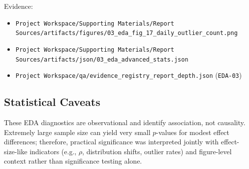 Evidence:
\begin{itemize}
  \item \verb|Project Workspace/Supporting Materials/Report Sources/artifacts/figures/03_eda_fig_17_daily_outlier_count.png|
  \item \verb|Project Workspace/Supporting Materials/Report Sources/artifacts/json/03_eda_advanced_stats.json|
  \item \verb|Project Workspace/qa/evidence_registry_report_depth.json| (\texttt{EDA-03})
\end{itemize}

\subsection{Statistical Caveats}
These EDA diagnostics are observational and identify association, not causality. Extremely large sample size can yield very small \(p\)-values for modest effect differences; therefore, practical significance was interpreted jointly with effect-size-like indicators (e.g., \(\rho\), distribution shifts, outlier rates) and figure-level context rather than significance testing alone.
